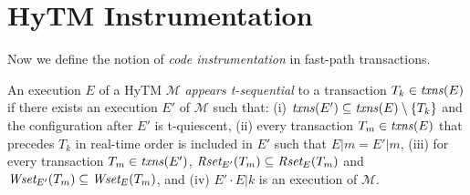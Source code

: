 \section{HyTM Instrumentation}
\label{sec:ins}
%
Now we define the notion of \emph{code instrumentation} in fast-path transactions.
%

An execution $E$ of a HyTM $\mathcal{M}$ \emph{appears t-sequential}
to a transaction $T_{k} \in \ms{txns}(E)$ if there exists an execution
$E'$ of $\mathcal{M}$ such that:
%
(i) $\ms{txns}(E')\subseteq \ms{txns}(E)\setminus \{T_k\}$ and the configuration after $E'$ is t-quiescent,
(ii) every transaction $T_m\in \ms{txns}(E)$
that precedes $T_k$ in real-time order is included in $E'$ such that $E|m=E'|m$,
(iii) for every transaction $T_m\in \ms{txns}(E')$, 
$\textit{Rset}_{E'}(T_m)\subseteq \textit{Rset}_E(T_m)$ and $\textit{Wset}_{E'}(T_m)\subseteq \textit{Wset}_E(T_m)$, and
(iv) $E'\cdot E|k$ is an execution of $\mathcal{M}$.
%
%
% 
%
